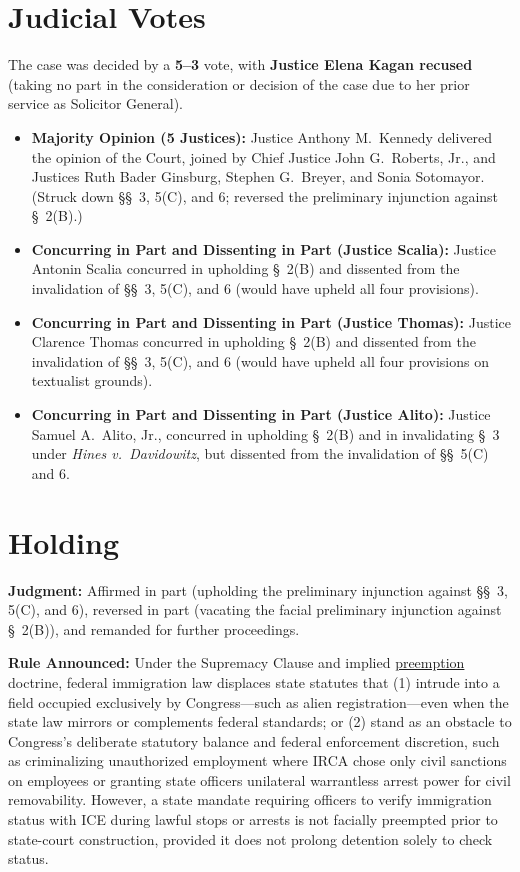 \documentclass[12pt]{article}
\begin{document}
\section{Judicial Votes}

The case was decided by a \textbf{5--3} vote, with \textbf{Justice Elena Kagan recused} (taking no part in the consideration or decision of the case due to her prior service as Solicitor General).

\begin{itemize}
\item \textbf{Majority Opinion (5 Justices):} Justice Anthony M.\ Kennedy delivered the opinion of the Court, joined by Chief Justice John G.\ Roberts, Jr., and Justices Ruth Bader Ginsburg, Stephen G.\ Breyer, and Sonia Sotomayor. (Struck down \S\S~3, 5(C), and 6; reversed the preliminary injunction against \S~2(B).)
\item \textbf{Concurring in Part and Dissenting in Part (Justice Scalia):} Justice Antonin Scalia concurred in upholding \S~2(B) and dissented from the invalidation of \S\S~3, 5(C), and 6 (would have upheld all four provisions).
\item \textbf{Concurring in Part and Dissenting in Part (Justice Thomas):} Justice Clarence Thomas concurred in upholding \S~2(B) and dissented from the invalidation of \S\S~3, 5(C), and 6 (would have upheld all four provisions on textualist grounds).
\item \textbf{Concurring in Part and Dissenting in Part (Justice Alito):} Justice Samuel A.\ Alito, Jr., concurred in upholding \S~2(B) and in invalidating \S~3 under \textit{Hines v.\ Davidowitz}, but dissented from the invalidation of \S\S~5(C) and 6.
\end{itemize}

\section{Holding}

\textbf{Judgment:} Affirmed in part (upholding the preliminary injunction against \S\S~3, 5(C), and 6), reversed in part (vacating the facial preliminary injunction against \S~2(B)), and remanded for further proceedings.

\textbf{Rule Announced:} Under the Supremacy Clause and implied \href{https://www.law.cornell.edu/wex/preemption}{preemption} doctrine, federal immigration law displaces state statutes that (1) intrude into a field occupied exclusively by Congress---such as alien registration---even when the state law mirrors or complements federal standards; or (2) stand as an obstacle to Congress's deliberate statutory balance and federal enforcement discretion, such as criminalizing unauthorized employment where IRCA chose only civil sanctions on employees or granting state officers unilateral warrantless arrest power for civil removability. However, a state mandate requiring officers to verify immigration status with ICE during lawful stops or arrests is not facially preempted prior to state-court construction, provided it does not prolong detention solely to check status.
\end{document}
